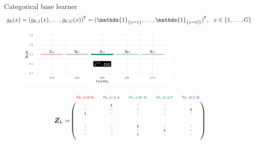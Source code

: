 \documentclass[t,10pt]{beamer}
\begin{document}
\begin{frame}{Categorical base learner}
  \vspace{-0.3cm}\[g_k(x) = (g_{k,1}(x), \dots, g_{k,G}(x))^\tran = (\mathds{1}_{\{x = 1\}}, \dots, \mathds{1}_{\{x = G\}})^\tran, \ \ x\in\{1, \dots, G\}\]
  \begin{center}
    \begin{figure}
      \includegraphics[width=0.7\textwidth]{figures/bs-cat/fig-cat6.png}
    \end{figure}
    \vspace{-0.5cm}
    \[
      \design_k = \tiny\begin{blockarray}{ccccc}
        \color[HTML]{EE0000}g_{k,GER} & \color[HTML]{631879}g_{k,USA} & \color[HTML]{008B45}g_{k,SWE} & \color[HTML]{008280}g_{k,ZAF} & \color[HTML]{3B4992}g_{k,ETH}\\
      \begin{block}{(ccccc)}
        \phantom{x}\\
        \color{lightgray}0 & \color{black}\bm{1} & \color{lightgray}0 & \color{lightgray}0 & \color{lightgray}0 \\
        \color{lightgray}0 & \color{lightgray}0 & \color{lightgray}0 & \color{lightgray}0 & \color{black}\bm{1} \\
        \color{black}\bm{1} & \color{lightgray}0 & \color{lightgray}0 & \color{lightgray}0 & \color{lightgray}0 \\
        \color{lightgray}\vdots & \color{lightgray}\vdots & \color{lightgray}\vdots & \color{lightgray}\vdots & \color{lightgray}\vdots \\
        \color{lightgray}0 & \color{lightgray}0 & \color{black}\bm{1} & \color{lightgray}0 & \color{lightgray}0 \\
        \color{lightgray}0 & \color{lightgray}0 & \color{lightgray}0 & \color{black}\bm{1} & \color{lightgray}0 \\
        \color{lightgray}0 & \color{lightgray}0 & \color[HTML]{008B45}\bm{1} & \color{lightgray}0 & \color{lightgray}0 \\
        \phantom{x}\\
      \end{block}
    \end{blockarray}
    \]
    \normalsize
  \end{center}
  \addtocounter{framenumber}{-1}
\end{frame}
\end{document}
